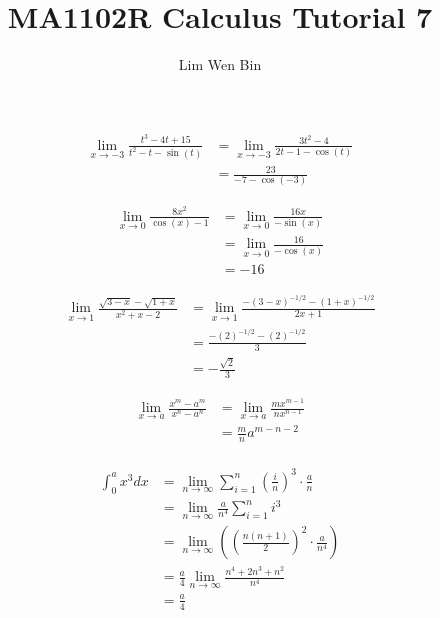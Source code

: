 \documentclass[12pt]{article}
\newenvironment{problem}[2][Problem]{\begin{trivlist}
\item[\hskip \labelsep {\bfseries #1}\hskip \labelsep {\bfseries #2.}]}{\end{trivlist}}
\begin{document}
\title{MA1102R Calculus Tutorial 7}
\author{Lim Wen Bin}
\maketitle
 
\begin{problem}{1.a}
\end{problem}
\begin{align*}
\lim_{x \to -3}\frac{t^3 -4t + 15}{t^2 -t - \sin(t)}
&= \lim_{x \to -3}\frac{3t^2 -4}{2t -1 - \cos(t)} \\
&= \frac{23}{-7 - \cos(-3)}
\end{align*}

\begin{problem}{1.b}
\end{problem}
\begin{align*}
\lim_{x \to 0} \frac{8x^2}{\cos(x) - 1} &=
\lim_{x \to 0} \frac{16x}{-\sin(x)} \\
&= \lim_{x \to 0} \frac{16}{-\cos(x)} \\
&= -16
\end{align*}

\begin{problem}{1.f}
\end{problem}
\begin{align*}
\lim_{x \to 1} \frac{\sqrt{3-x} - \sqrt{1+x}}{x^2 + x - 2}
&= \lim_{x \to 1} \frac{-(3-x)^{-1/2} - (1+x)^{-1/2}}{2x + 1}\\
&= \frac{-(2)^{-1/2} - (2)^{-1/2}}{3} \\
&= -\frac{\sqrt{2}}{3}
\end{align*}

\begin{problem}{1.g}
\end{problem}
\begin{align*}
\lim_{x \to a} \frac{x^m - a^m}{x^n - a^n} &=
\lim_{x \to a} \frac{mx^{m-1}}{nx^{n-1}} \\
&= \frac{m}{n}a^{m-n-2}\\
\end{align*}

\begin{problem}{2}
\end{problem}
\begin{align*}
\int_{0}^{a} x^3 dx &= \lim_{n \to \infty} \sum_{i=1}^{n} (\frac{i}{n})^3 \cdot \frac{a}{n} \\
&= \lim_{n \to \infty} \frac{a}{n^4} \sum_{i=1}^{n} i^3 \\
&= \lim_{n \to \infty}((\frac{n(n+1)}{2}) ^2 \cdot \frac{a}{n^4})\\
&= \frac{a}{4} \lim_{n \to \infty} \frac{n^4 + 2n^3 + n^2}{n^4}\\
&= \frac{a}{4}
\end{align*}
\end{document}
